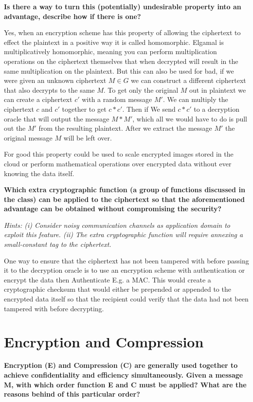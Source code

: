 \documentclass[letterpaper,11pt,notitlepage,fleqn]{article}
\begin{document}
\noindent \textbf{Is  there  a  way  to  turn  this  (potentially)  undesirable  property  into  an  advantage, describe how if there is one?}

Yes, when an encryption scheme has this property of allowing the ciphertext to effect the plaintext in a positive way it is called homomorphic. Elgamal is multiplicatively homomorphic, meaning you can perform multiplication operations on the ciphertext themselves that when decrypted will result in the same multiplication on the plaintext. But this can also be used for bad, if we were given an unknown ciphertext $M \in G$ we can construct a different ciphertext that also decrypts to the same $M$. To get only the original
$M$ out in plaintext we can create a ciphertext $c'$ with a random message $M'$. We can multiply the ciphertext $c$ and $c'$ together to get $c*c'$. Then if We  send $c*c'$ to a decryption oracle that will output the message $M*M'$, which all we would have to do is pull out the $M'$ from the resulting plaintext. After we extract the message $M'$ the original message $M$ will be left over. 

For good this property could be used to scale encrypted images stored in the cloud or perform mathematical operations over encrypted data without ever knowing the data itself. 

\noindent \textbf{Which  extra  cryptographic  function  (a  group  of  functions  discussed  in  the  class)  can be applied to the ciphertext so that the aforementioned advantage can be obtained without compromising the security?}

\noindent \textit{Hints:  (i) Consider  noisy  communication  channels  as  application  domain  to  exploit  this  feature. 
(ii) The extra cryptographic function will require annexing a small-constant tag to the ciphertext.}

One way to ensure that the ciphertext has not been tampered with before passing it to the decryption oracle is to use an encryption scheme with authentication or encrypt the data then Authenticate E.g. a MAC. This would create a cryptographic checksum that would either be prepended or appended to the encrypted data itself so that the recipient could verify that the data had not been tampered with before decrypting. 

\section{Encryption and Compression}
\noindent \textbf{Encryption (E) and Compression (C) are generally used together to achieve confidentiality and  efficiency  simultaneously. Given  a message M, with which order  function E  and C must be applied? What are the reasons behind of this particular order?}
\end{document}
